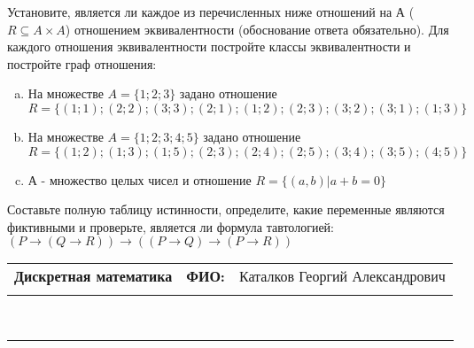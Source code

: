 \documentclass[10pt]{exam}
\newcommand{\class}{Дискретная математика}
\newcommand{\examdate}{}
\begin{document}
\begin{questions}
\question
Установите, является ли каждое из перечисленных ниже отношений на А ($R \subseteq A \times A$) отношением эквивалентности (обоснование ответа обязательно). Для каждого отношения эквивалентности постройте классы 
эквивалентности и постройте граф отношения:
\begin{enumerate} [a)]\setcounter{enumi}{0}
\item На множестве $A = \{1; 2; 3\}$ задано отношение $R = \{(1; 1); (2; 2); (3; 3); (2; 1); (1; 2); (2; 3); (3; 2); (3; 1); (1; 3)\}$
\item На множестве $A = \{1; 2; 3; 4; 5\}$ задано отношение $R = \{(1; 2); (1; 3); (1; 5); (2; 3); (2; 4); (2; 5); (3; 4); (3; 5); (4; 5)\}$
\item А - множество целых чисел и отношение $R = \{(a,b)|a + b = 0\}$
\end{enumerate}\question Составьте полную таблицу истинности, определите, какие переменные являются фиктивными и проверьте, является ли формула тавтологией:
$(P \rightarrow (Q \rightarrow R)) \rightarrow ((P \rightarrow Q) \rightarrow (P \rightarrow R))$

\end{questions}
\newpage
\begin{flushright}
\begin{tabular}{p{2.8in} r l}
\textbf{\class} & \textbf{ФИО:} &Каталков Георгий Александрович
\\

\textbf{\examdate} &&\\
\end{tabular}\\
\end{flushright}
\rule[1ex]{\textwidth}{.1pt}
\end{document}
